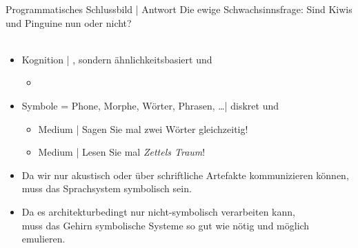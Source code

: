 \begin{frame}
  {Programmatisches Schlussbild | Antwort}
  \onslide<+->
  \onslide<+->
  Die ewige Schwachsinnsfrage: Sind Kiwis und Pinguine nun  oder nicht?\\
  \Viertelzeile
  \\
  \Zeile
  \begin{itemize}[<+->]
    \item \alert{Kognition} | , sondern ähnlichkeitsbasiert und 
      \begin{itemize}[<+->]
        \item {}
      \end{itemize}
      \Halbzeile
    \item \alert{Symbole} = Phone, Morphe, Wörter, Phrasen, \ldots |  diskret und 
      \begin{itemize}[<+->]
        \item {} Medium | Sagen Sie mal zwei Wörter gleichzeitig!
        \item {} Medium | Lesen Sie mal \textit{Zettels Traum}!
      \end{itemize}
    \Halbzeile
    \item[\ding{222}] Da wir nur akustisch oder über schriftliche Artefakte kommunizieren können,\\
      \alert{muss das Sprachsystem symbolisch sein}.
    \item[\ding{222}] Da es architekturbedingt nur nicht-symbolisch verarbeiten kann,\\
      \alert{muss das Gehirn symbolische Systeme so gut wie nötig und möglich emulieren}.
  \end{itemize}
\end{frame}


